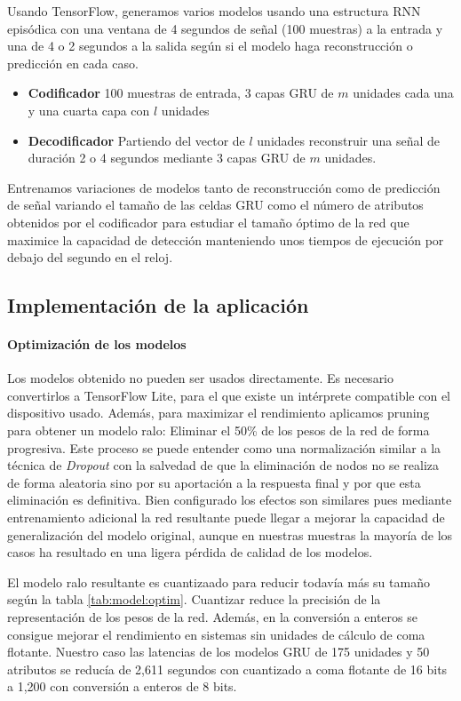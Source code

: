 \documentclass[11pt,a4paper,spanish,twocolumn]{article}
\begin{document}
Usando TensorFlow, generamos varios modelos usando una estructura RNN episódica con una ventana de 4 segundos de señal (100 muestras) a la entrada y una de 4 o 2 segundos a la salida según si el modelo haga reconstrucción o predicción en cada caso.
\begin{itemize}
  \item \textbf{Codificador} 100 muestras de entrada, 3 capas GRU de $m$ unidades cada una y una cuarta capa con $l$ unidades
  \item \textbf{Decodificador} Partiendo del vector de $l$ unidades reconstruir una señal de duración 2 o 4 segundos mediante 3 capas GRU de $m$ unidades.
\end{itemize}

Entrenamos variaciones de modelos tanto de reconstrucción como de predicción de señal variando el tamaño de las celdas GRU como el número de atributos obtenidos por el codificador para estudiar el tamaño óptimo de la red que maximice la capacidad de detección manteniendo unos tiempos de ejecución por debajo del segundo en el reloj.

\subsection{Implementación de la aplicación}

\paragraph{Optimización de los modelos}
Los modelos obtenido no pueden ser usados directamente. Es necesario convertirlos a TensorFlow Lite, para el que existe un intérprete compatible con el dispositivo usado. Además, para maximizar el rendimiento aplicamos pruning para obtener un modelo ralo: Eliminar el 50\% de los pesos de la red de forma progresiva. Este proceso se puede entender como una normalización similar a la técnica de \textit{Dropout} con la salvedad de que la eliminación de nodos no se realiza de forma aleatoria sino por su aportación a la respuesta final y por que esta eliminación es definitiva. Bien configurado los efectos son similares pues mediante entrenamiento adicional la red resultante puede llegar a mejorar la capacidad de generalización del modelo original\cite{Cai2020}, aunque en nuestras muestras la mayoría de los casos ha resultado en una ligera pérdida de calidad de los modelos.

El modelo ralo resultante es cuantizaado para reducir todavía más su tamaño según la tabla \ref{tab:model:optim}. Cuantizar reduce la precisión de la representación de los pesos de la red. Además, en la conversión a enteros se consigue mejorar el rendimiento en sistemas sin unidades de cálculo de coma flotante. Nuestro caso las latencias de los modelos GRU de 175 unidades y 50 atributos se reducía de 2,611 segundos con cuantizado a coma flotante de 16 bits a 1,200 con conversión a enteros de 8 bits.
\end{document}
